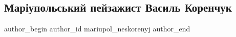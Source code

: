  
 
 
 
 

\subsection{Маріупольський пейзажист Василь Коренчук}
\label{sec:07_08_2023.fb.mariupol_neskorenyj.1.mariupol_pejzazhist_vasyl_korenchuk}

\ifcmt
 author_begin
   author_id mariupol_neskorenyj
 author_end
\fi
